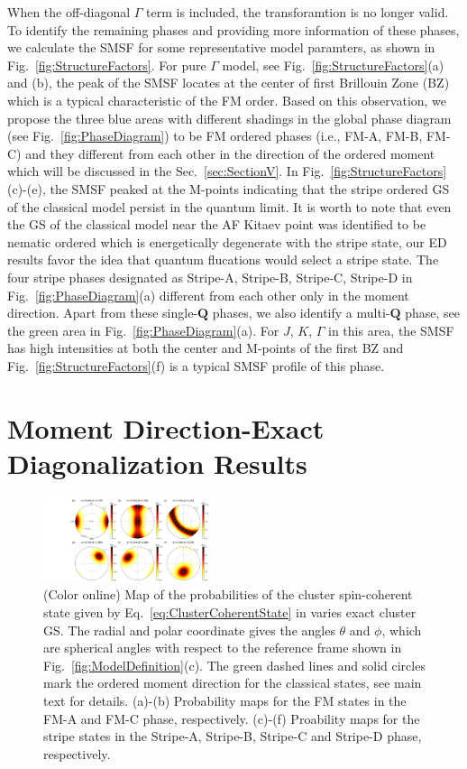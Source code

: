 \documentclass[aps,prb,reprint,amsfonts,amsmath,amssymb,showpacs,groupedaddress,superscriptaddress]{revtex4-1}
\begin{document}
When the off-diagonal $\Gamma$ term is included, the transforamtion is no longer valid. To identify the remaining phases and providing more information of these phases, we calculate the SMSF for some representative model paramters, as shown in Fig.~\ref{fig:StructureFactors}. For pure $\Gamma$ model, see Fig.~\ref{fig:StructureFactors}(a) and (b), the peak of the SMSF locates at the center of first Brillouin Zone (BZ) which is a typical characteristic of the FM order. Based on this observation, we propose the three blue areas with different shadings in the global phase diagram (see Fig.~\ref{fig:PhaseDiagram}) to be FM ordered phases (i.e., FM-A, FM-B, FM-C) and they different from each other in the direction of the ordered moment which will be discussed in the Sec.~\ref{sec:SectionV}. In Fig.~\ref{fig:StructureFactors}(c)-(e), the SMSF peaked at the M-points indicating that the stripe ordered GS of the classical model persist in the quantum limit. It is worth to note that even the GS of the classical model near the AF Kitaev point was identified to be nematic ordered which is energetically degenerate with the stripe state, our ED results favor the idea that quantum flucations would select a stripe state. The four stripe phases designated as Stripe-A, Stripe-B, Stripe-C, Stripe-D in Fig.~\ref{fig:PhaseDiagram}(a) different from each other only in the moment direction. Apart from these single-$\mathbf{Q}$ phases, we also identify a multi-$\mathbf{Q}$ phase, see the green area in Fig.~\ref{fig:PhaseDiagram}(a). For $J$, $K$, $\Gamma$ in this area, the SMSF has high intensities at both the center and M-points of the first BZ and Fig.~\ref{fig:StructureFactors}(f) is a typical SMSF profile of this phase.

\section{\label{sec:SectionV}Moment Direction-Exact Diagonalization Results}
\begin{figure}
    \includegraphics[width=0.45\textwidth]{Fig4.pdf}
    \caption{\label{fig:Proabilities}(Color online) Map of the probabilities of the cluster spin-coherent state given by Eq.~\eqref{eq:ClusterCoherentState} in varies exact cluster GS. The radial and polar coordinate gives the angles $\theta$ and $\phi$, which are spherical angles with respect to the reference frame shown in Fig.~\ref{fig:ModelDefinition}(c). The green dashed lines and solid circles mark the ordered moment direction for the classical states, see main text for details. (a)-(b) Probability maps for the FM states in the FM-A and FM-C phase, respectively. (c)-(f) Proability maps for the stripe states in the Stripe-A, Stripe-B, Stripe-C and Stripe-D phase, respectively.}
\end{figure}
\end{document}
